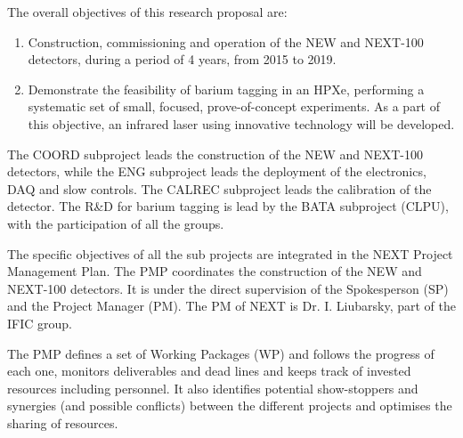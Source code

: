 

The overall objectives of this research proposal are:

\begin{enumerate}
\item Construction, commissioning and operation of the NEW and NEXT-100 detectors, during a period of 4 years, from 2015 to 2019.
\item Demonstrate the feasibility of barium tagging in an HPXe, performing a systematic set of small, focused, prove-of-concept experiments. As a part of this objective, an infrared laser using innovative technology will be developed. 
\end{enumerate}
  
The COORD subproject leads the construction of the NEW and NEXT-100 detectors, while the ENG subproject leads the deployment of the electronics, DAQ and slow controls. The CALREC subproject leads the calibration of the detector. The R\&D for barium tagging is lead by the BATA subproject (CLPU), with the participation of all the groups.   

The specific objectives of all the sub projects are integrated in the NEXT Project Management Plan. 
The PMP coordinates the construction of the NEW and NEXT-100 detectors. It is under the direct supervision of the Spokesperson (SP) and the Project Manager (PM). The PM of NEXT is Dr. I. Liubarsky, part of the IFIC group. 

The PMP defines a set of Working Packages (WP) and follows the progress of each one, monitors deliverables and dead lines and keeps track of invested resources including personnel. It also identifies potential show-stoppers and synergies (and possible conflicts) between the different projects and optimises the sharing of resources. 



